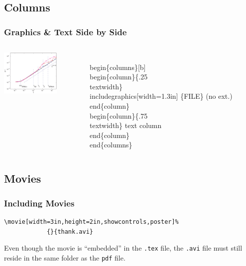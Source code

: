 \documentclass{beamer}
\newcommand{\blue}[1]{\usebeamercolor[fg]{blue}#1}
\begin{document}
\subsection{Columns}
\begin{frame}[fragile]
\frametitle{Graphics \& Text  Side by Side}
\begin{columns}[b]
  \begin{column}{.25\textwidth}
       \includegraphics[width=1.1in]{advdiff_step-1}
  \end{column}
    \begin{column}{.75\textwidth}
    \begin{semiverbatim}
 \alert<1>{\\begin\{columns\}[b]}
  \alert<2>{\\begin\{column\}\{.25\\textwidth\}}
        \alert<3>{\\includegraphics[width=1.3in]%
             \{FILE\} ({\blue no ext.})}
  \alert<2>{\\end\{column\}}
   \alert<4>{\\begin\{column\}\{.75\\textwidth\}}
        \alert<5>{text column}
   \alert<4>{\\end\{column\}}
 \alert<1>{\\end\{columns\}}
    \end{semiverbatim}
      \end{column}
\end{columns}
\end{frame} 


\subsection{Movies}

\begin{frame}[fragile]
  \frametitle{Including Movies}
\begin{verbatim}
\movie[width=3in,height=2in,showcontrols,poster]%
            {}{thank.avi}
\end{verbatim}

\medskip


Even though the movie is ``embedded'' in the \texttt{.tex} file, the \texttt{.avi} file must still reside in the same folder as the \texttt{pdf}  file.
\end{frame}
\end{document}
